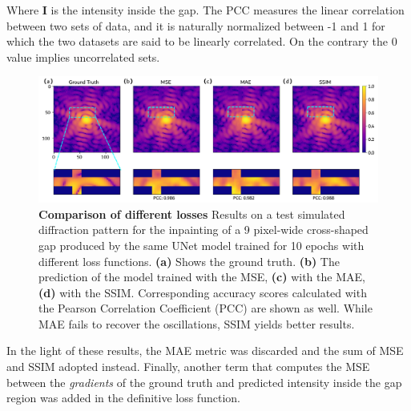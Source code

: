 Where \textbf{I} is the intensity inside the gap. The PCC measures the linear correlation between two sets of data, 
and it is naturally normalized between -1 and 1 for which the two datasets are said to be linearly correlated. On the 
contrary the 0 value implies uncorrelated sets. 

\begin{figure}[h]
    \includegraphics[width=\textwidth]{figures/Inpainting/loss_comparison.pdf}
    \caption{\textbf{Comparison of different losses} Results on a test simulated diffraction pattern for the inpainting 
    of a 9 pixel-wide cross-shaped gap produced by the same UNet model trained for 10 epochs with different loss functions. 
    \textbf{(a)} Shows the ground truth. \textbf{(b)} The prediction of the model trained with the MSE, \textbf{(c)} 
    with the MAE, \textbf{(d)} with the SSIM. Corresponding accuracy scores calculated with the Pearson Correlation 
    Coefficient (PCC) are shown as well. While MAE fails to recover the oscillations, SSIM yields better results.}
    \label{fig:loss_comparison_inpainting}
\end{figure}

In the light of these results, the MAE metric was discarded and the sum of MSE and SSIM adopted instead. 
Finally, another term that computes the MSE between the \textit{gradients} of the ground truth and predicted intensity inside
the gap region was added in the definitive loss function.\\

